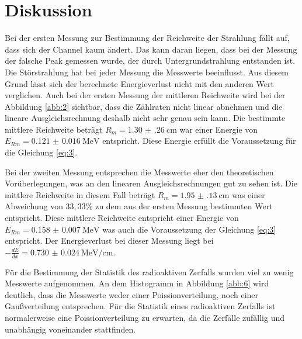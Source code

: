 \section{Diskussion}

Bei der ersten Messung zur Bestimmung der Reichweite der Strahlung fällt auf, dass
sich der Channel kaum ändert. Das kann daran liegen, dass bei der Messung der falsche Peak
gemessen wurde, der durch Untergrundstrahlung entstanden ist. Die Störstrahlung hat bei jeder Messung
die Messwerte beeinflusst.
Aus diesem Grund lässt sich der berechnete Energieverlust nicht mit den anderen Wert
verglichen.
Auch bei der ersten Messung der mittleren Reichweite wird bei der Abbildung \ref{abb:2}
sichtbar, dass die Zählraten nicht linear abnehmen und die lineare Ausgleichsrechnung
deshalb nicht sehr genau sein kann. Die bestimmte mittlere Reichweite beträgt
$R_m = \SI{1.30(26)}{\centi\meter}$ war einer Energie von $E_{Rm} = \SI{0.121(16)}{\mega\eV}$
entspricht. Diese Energie erfüllt die Voraussetzung für die Gleichung \ref{eq:3}.

Bei der zweiten Messung entsprechen die Messwerte eher den theoretischen Vorüberlegungen,
was an den linearen Ausgleichsrechnungen gut zu sehen ist. Die mittlere Reichweite
in diesem Fall beträgt $R_m = \SI{1.95(13)}{\centi\meter}$ was einer Abweichung
von $33,33 \%$ zu dem aus der ersten Messung bestimmten Wert entspricht.
Diese mittlere Reichweite entspricht einer Energie von $E_{Rm} = \SI{0.158(7)}{\mega\eV}$
was auch die Voraussetzung der Gleichung \ref{eq:3} entspricht.
Der Energieverlust bei dieser Messung liegt bei $-\frac{dE}{dx} = \SI{0.730(24)}{\mega\eV\per\centi\meter}$.

Für die Bestimmung der Statistik des radioaktiven Zerfalls wurden viel zu wenig
Messwerte aufgenommen. An dem Histogramm in Abbildung \ref{abb:6} wird deutlich,
dass die Messwerte weder einer Poissionverteilung, noch einer Gaußverteilung
entsprechen. Für die Statistik eines radioaktiven Zerfalls ist normalerweise eine Poissionverteilung
zu erwarten, da die Zerfälle zufällig und unabhängig voneinander stattfinden.
